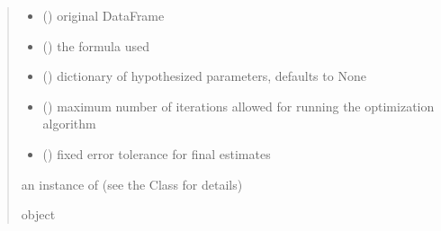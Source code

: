 \documentclass[letterpaper,10pt,english]{sphinxmanual}
\begin{document}
\begin{fulllineitems}
\begin{quote}
\begin{description}
\begin{itemize}
\item {} 
\sphinxAtStartPar
{} () \textendash{} original DataFrame

\item {} 
\sphinxAtStartPar
{} () \textendash{} the formula used

\item {} 
\sphinxAtStartPar
{} (\sphinxstyleliteralemphasis{\sphinxupquote{, }}) \textendash{} dictionary of hypothesized parameters, defaults to None

\item {} 
\sphinxAtStartPar
{} () \textendash{} maximum number of iterations allowed for running the optimization algorithm

\item {} 
\sphinxAtStartPar
{} () \textendash{} fixed error tolerance for final estimates

\end{itemize}

\sphinxAtStartPar
an instance of  (see the Class for details)

\sphinxAtStartPar
object

\end{description}\end{quote}

\end{fulllineitems}

\end{document}
